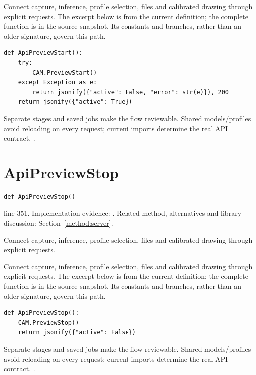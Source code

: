 Connect capture, inference, profile selection, files and calibrated drawing through explicit requests. The excerpt below is from the current definition; the complete function is in the source snapshot. Its constants and branches, rather than an older signature, govern this path.


\begin{lstlisting}[style=plain]
def ApiPreviewStart():
    try:
        CAM.PreviewStart()
    except Exception as e:
        return jsonify({"active": False, "error": str(e)}), 200
    return jsonify({"active": True})
\end{lstlisting}
Separate stages and saved jobs make the flow reviewable. Shared models/profiles avoid reloading on every request; current imports determine the real API contract. \cite{flaskdocs,pillowops,code2026}.


\section{ApiPreviewStop}\label{fn:web-server:ApiPreviewStop}
\begin{lstlisting}[style=sig]
def ApiPreviewStop()
\end{lstlisting}
 line 351. Implementation evidence: \cite{code2026}. Related method, alternatives and library discussion: Section~\ref{method:server}.


Connect capture, inference, profile selection, files and calibrated drawing through explicit requests.


Connect capture, inference, profile selection, files and calibrated drawing through explicit requests. The excerpt below is from the current definition; the complete function is in the source snapshot. Its constants and branches, rather than an older signature, govern this path.


\begin{lstlisting}[style=plain]
def ApiPreviewStop():
    CAM.PreviewStop()
    return jsonify({"active": False})
\end{lstlisting}
Separate stages and saved jobs make the flow reviewable. Shared models/profiles avoid reloading on every request; current imports determine the real API contract. \cite{flaskdocs,pillowops,code2026}.


